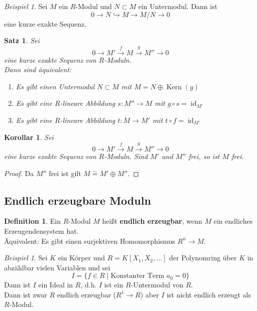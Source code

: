 \documentclass[10pt,a4paper]{article}
\newcommand{\id}{\operatorname{id}}
\newcommand{\isom}{\overset{\sim}{=}}
\newcommand{\Kern}{\operatorname{Kern}}
\theoremstyle{plain}
\newtheorem{kor}[theorem]{Korollar}
\newtheorem{satz}[theorem]{Satz}
\theoremstyle{definition}
\newtheorem{definition}[theorem]{Definition}
\theoremstyle{remark}
\newtheorem{exm}[theorem]{Beispiel}
\begin{document}
	\begin{exm}
		Sei $M$ ein $R$-Modul und $N\subset M$ ein Untermodul. Dann ist
		\[0\to N\hookrightarrow M\to M/N\to 0\]
		eine kurze exakte Sequenz.
	\end{exm}

	\begin{satz}
		Sei
		\[0\to M'\xrightarrow{f}M\xrightarrow{g}M''\to 0\]
		eine kurze exakte Sequenz von $R$-Moduln.\\
		Dann sind äquivalent:
		\begin{enumerate}
			\item Es gibt einen Untermodul $N\subset M$ mit $M=N\oplus\Kern(g)$
			\item Es gibt eine $R$-lineare Abbildung $s:M''\to M$ mit $g\circ s=\id_{M'}$
			\item Es gibt eine $R$-lineare Abbildung $t:M\to M'$ mit $t\circ f=\id_{M'}$
		\end{enumerate}
	\end{satz}

	
	\begin{kor}
		Sei
		\[0\to M'\xrightarrow{f}M\xrightarrow{g}M''\to 0\]
		eine kurze exakte Sequenz von $R$-Moduln. Sind $M'$ und $M''$  frei, so ist $M$ frei.
	\end{kor}
	\begin{proof}
		Da $M''$ frei ist gilt $M\isom M'\oplus M''$.
	\end{proof}

	\subsection{Endlich erzeugbare Moduln}
	\begin{definition}
		Ein $R$-Modul $M$ heißt \textbf{endlich erzeugbar}, wenn $M$ ein endliches Erzeugendensystem hat.\\
		Äquivalent: Es gibt einen surjektiven Homomorphismus $R^n\to M$.
	\end{definition}

	\begin{exm}
		Sei $K$ ein Körper und $R=K[X_1,X_2,...]$ der Polynomring über $K$ in abzählbar vielen Variablen und sei
		\[I=\{f\in R\mid \text{Konstanter Term }a_0=0\}\]
		Dann ist $I$ ein Ideal in $R$, d.h. $I$ ist ein $R$-Untermodul von $R$.\\
		Dann ist zwar $R$ endlich erzeugbar ($R^1\to R$) aber $I$ ist nicht endlich erzeugt als $R$-Modul.
	\end{exm}
\end{document}
